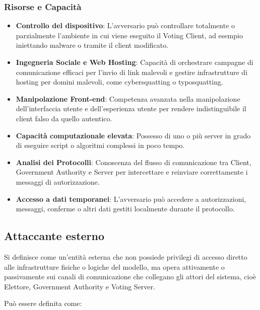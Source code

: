 \documentclass[a4paper,12pt]{article}
\begin{document}
\subsubsection*{Risorse e Capacità}

\begin{itemize}
    \item \textbf{Controllo del dispositivo}: L'avversario può controllare totalmente o parzialmente l'ambiente in cui viene eseguito il Voting Client, ad esempio iniettando malware o tramite il client modificato.

    \item \textbf{Ingegneria Sociale e Web Hosting}: Capacità di orchestrare campagne di comunicazione efficaci per l'invio di link malevoli e gestire infrastrutture di hosting per domini malevoli, come cybersquatting o typosquatting.

    \item \textbf{Manipolazione Front-end}: Competenza avanzata nella manipolazione dell'interfaccia utente e dell'esperienza utente per rendere indistinguibile il client falso da quello autentico.

    \item \textbf{Capacità computazionale elevata}: Possesso di uno o più server in grado di eseguire script o algoritmi complessi in poco tempo.

    \item \textbf{Analisi dei Protocolli}: Conoscenza del flusso di comunicazione tra Client, Government Authority e Server per intercettare e reinviare correttamente i messaggi di autorizzazione.

    \item \textbf{Accesso a dati temporanei}: L'avversario può accedere a autorizzazioni, messaggi, conferme o altri dati gestiti localmente durante il protocollo.
\end{itemize}

\subsection{Attaccante esterno}

Si definisce come un'entità esterna che non possiede privilegi di accesso diretto alle infrastrutture fisiche o logiche del modello, 
ma opera attivamente o passivamente sui canali di comunicazione che collegano gli attori del sistema, cioè Elettore, Government Authority e Voting Server.

Può essere definita come:
\end{document}
